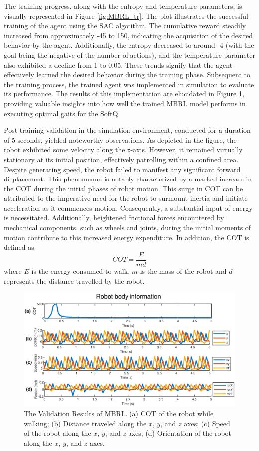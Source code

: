 The training progress, along with the entropy and temperature parameters, is visually represented in Figure \ref{fig:MBRL_tr}. The plot illustrates the successful training of the agent using the SAC algorithm. The cumulative reward steadily increased from approximately -45 to 150, indicating the acquisition of the desired behavior by the agent. Additionally, the entropy decreased to around -4 (with the goal being the negative of the number of actions), and the temperature parameter also exhibited a decline from 1 to 0.05. These trends signify that the agent effectively learned the desired behavior during the training phase. Subsequent to the training process, the trained agent was implemented in simulation to evaluate its performance. The results of this implementation are elucidated in Figure \ref{fig:MBRL_val}, providing valuable insights into how well the trained MBRL model performs in executing optimal gaits for the SoftQ. 

Post-training validation in the simulation environment, conducted for a duration of 5 seconds, yielded noteworthy observations. As depicted in the figure, the robot exhibited some velocity along the x-axis. However, it remained virtually stationary at its initial position, effectively patrolling within a confined area. Despite generating speed, the robot failed to manifest any significant forward displacement. This phenomenon is notably characterized by a marked increase in the \ac{COT} during the initial phases of robot motion. This surge in \ac{COT} can be attributed to the imperative need for the robot to surmount inertia and initiate acceleration as it commences motion. Consequently, a substantial input of energy is necessitated. Additionally, heightened frictional forces encountered by mechanical components, such as wheels and joints, during the initial moments of motion contribute to this increased energy expenditure. In addition, the COT is defined as $$COT = \frac{E}{md}$$ where $E$ is the energy consumed to walk, $m$ is the mass of the robot and $d$ represents the distance travelled by the robot.

\begin{figure}[htb]
    \centering
    \includegraphics[width=\linewidth]{img/chap5/MBRL_val.eps}
    \caption{The Validation Results of MBRL. (a) COT of the robot while walking; (b) Distance traveled along the $x$, $y$, and $z$ axes; (c) Speed of the robot along the $x$, $y$, and $z$ axes; (d) Orientation of the robot along the $x$, $y$, and $z$ axes.}
    \label{fig:MBRL_val}
\end{figure}

